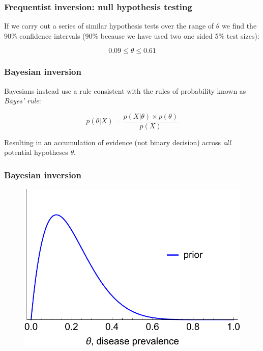 \documentclass[handout]{beamer}
\begin{document}
\begin{frame}
	\frametitle{Frequentist inversion: null hypothesis testing}
		If we carry out a series of similar hypothesis tests over the range of $\theta$ we find the 90\% confidence intervals (90\% because we have used two one sided 5\% test sizes):
		 
			\begin{equation}
			0.09 \leq \theta \leq 0.61
			\end{equation}
	
\end{frame}

\begin{frame}
	\frametitle{Bayesian inversion}
	Bayesians instead use a rule consistent with the rules of probability known as \textit{Bayes' rule}:
	
	\begin{equation}
	p(\theta|X) = \frac{p(X|\theta)\times p(\theta)}{p(X)}
	\end{equation}
	
	Resulting in an accumulation of evidence (not binary decision) across \textit{all} potential hypotheses $\theta$.
	
\end{frame}

\begin{frame}
	\frametitle{Bayesian inversion}
	
		\begin{figure}[ht]
			\centerline{\includegraphics[width=\textwidth]{animations_figures/binomial_prior.pdf}}
		\end{figure}
	
\end{frame}
\end{document}
